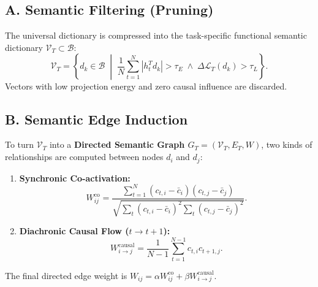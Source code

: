 \documentclass[11pt,a4paper]{article}
\begin{document}
\subsection*{A. Semantic Filtering (Pruning)}
The universal dictionary is compressed into the task-specific functional semantic dictionary $\mathcal V_T\subset\mathcal B$:
\begin{equation}\mathcal V_T=\left\{d_k\in\mathcal B\;\middle|\;\frac1N\sum_{t=1}^N|h_t^Td_k|>\tau_E\;\land\;\Delta\mathcal L_T(d_k)>\tau_L\right\}.\end{equation}
Vectors with low projection energy and zero causal influence are discarded.

\subsection*{B. Semantic Edge Induction}
To turn $\mathcal V_T$ into a \textbf{Directed Semantic Graph $G_T=(\mathcal V_T,E_T,W)$}, two kinds of relationships are computed between nodes $d_i$ and $d_j$:
\begin{enumerate}
\item \textbf{Synchronic Co-activation:}
\begin{equation}W_{ij}^{\text{co}}=\frac{\sum_{t=1}^N(c_{t,i}-\bar c_i)(c_{t,j}-\bar c_j)}{\sqrt{\sum_t(c_{t,i}-\bar c_i)^2\sum_t(c_{t,j}-\bar c_j)^2}}.\end{equation}
\item \textbf{Diachronic Causal Flow ($t\rightarrow t+1$):}
\begin{equation}W_{i\to j}^{\text{causal}}=\frac1{N-1}\sum_{t=1}^{N-1}c_{t,i}c_{t+1,j}.\end{equation}
\end{enumerate}
The final directed edge weight is $W_{ij}=\alpha W_{ij}^{\text{co}}+\beta W_{i\to j}^{\text{causal}}$.
\end{document}
